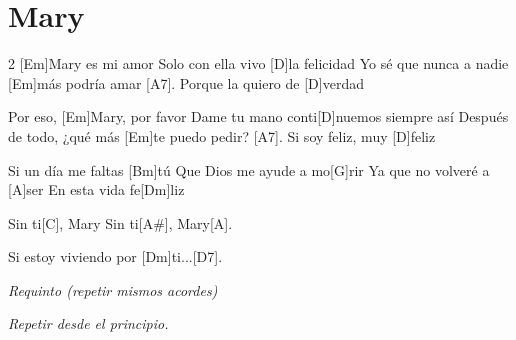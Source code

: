 \section{Mary}

\noindent
\chordEm
\chordD
\chordAs
\chordBm
\chordG
\chordA
\chordDm
\chordC
\chordAsh
\chordAsh
\chordDs

\vspace{1cm}

\begin{guitar}
	\begin{multicols}{2}
		[Em]Mary es mi amor
		Solo con ella vivo [D]la felicidad
		Yo sé que nunca a nadie [Em]más podría amar [A7].
		Porque la quiero de [D]verdad


		Por eso, [Em]Mary, por favor
		Dame tu mano conti[D]nuemos siempre así
		Después de todo, ¿qué más [Em]te puedo pedir? [A7].
		Si soy feliz, muy [D]feliz


		Si un día me faltas [Bm]tú
		Que Dios me ayude a mo[G]rir
		Ya que no volveré a [A]ser
		En esta vida fe[Dm]liz


		Sin ti[C], Mary
		Sin ti[A#], Mary[A].


		Si estoy viviendo por [Dm]ti...\hspace{1cm}[D7].


		\textit{Requinto (repetir mismos acordes)}


		\textit{Repetir desde el principio.}

		
	\end{multicols}
\end{guitar}
